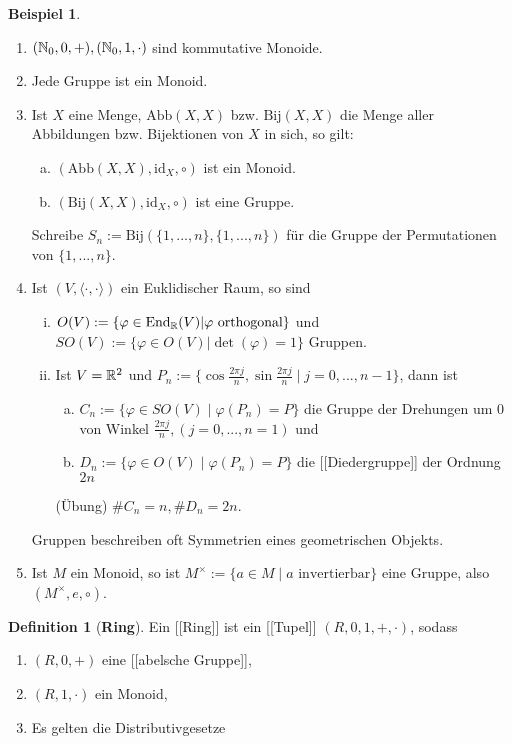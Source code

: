 \documentclass[a4paper]{article}
\theoremstyle{plain}
\theoremstyle{definition}
\newtheorem{defi}[thm]{Definition}
\newtheorem*{bsp*}{Beispiel}
\begin{document}
\begin{bsp*}
  \begin{enumerate}[1)]
\item $(\Bbb N_{0}, 0, +), (\Bbb N_{0}, 1, \cdot)$ sind kommutative Monoide.
\item Jede Gruppe ist ein Monoid.
\item Ist $X$ eine Menge, $\mathrm{Abb}(X,X)$ bzw. $\mathrm{Bij}(X,X)$ die Menge aller Abbildungen bzw. Bijektionen von $X$ in sich, so gilt:
\begin{enumerate}[(a)]
    \item $(\mathrm{Abb}(X,X), \mathrm{id}_{X}, \circ)$ ist ein Monoid.
    \item $(\mathrm{Bij}(X,X), \mathrm{id}_{X}, \circ)$ ist eine Gruppe.
\end{enumerate}
    Schreibe $S_{n}:=\mathrm{Bij}(\{1, ..., n\}, \{1, ..., n\})$ für die Gruppe der Permutationen von $\{1, ..., n\}$.
    \item Ist $(V, \langle \cdot, \cdot \rangle)$ ein Euklidischer Raum, so sind
    \begin{enumerate}[(i)]
    \item $O(V):= \{\varphi \in \mathrm{End}_{\Bbb R}(V) | \varphi \text{ orthogonal}\}$ und $SO(V):= \{\varphi \in O(V) | \det(\varphi) = 1\}$ Gruppen.
    \item Ist $V = \Bbb R^{2}$ und $P_{n}:=\{\cos \frac{2\pi j}{n}, \sin \frac{2\pi j}{n} \mid j = 0, ..., n-1\}$, dann ist
    \begin{enumerate}[(a)]
        \item $C_{n}:= \{\varphi \in SO(V) \mid \varphi(P_{n}) = P\}$ die Gruppe der Drehungen um 0 von Winkel $\frac{2\pi j}{n}, (j=0, ..., n=1)$ und
        \item $D_{n}:= \{\varphi \in O(V) \mid \varphi(P_{n})=P\}$ die [[Diedergruppe]] der Ordnung $2n$

    \end{enumerate}
        (Übung) $\#C_{n} = n, \#D_{n} = 2n$.
    \end{enumerate}
    Gruppen beschreiben oft Symmetrien eines geometrischen Objekts.
\item Ist $M$ ein Monoid, so ist $M^{\times}:=\{a \in M \mid a \text{ invertierbar}\}$ eine Gruppe, also $(M^{\times}, e, \circ)$.

  \end{enumerate}


\end{bsp*}
\begin{defi}[\textbf{Ring}]
  Ein [[Ring]] ist ein [[Tupel]] $(R, 0, 1, +, \cdot)$, sodass
  \begin{enumerate}[(R1)]
    \item $(R, 0, +)$ eine [[abelsche Gruppe]],
    \item $(R, 1, \cdot)$ ein Monoid,
    \item Es gelten die Distributivgesetze
  \end{enumerate}
\end{defi}
\end{document}
